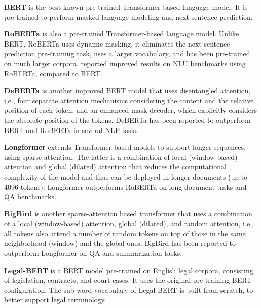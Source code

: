 \documentclass[11pt]{article}
\begin{document}
\noindent\textbf{BERT} \cite{devlin-etal-2019-bert} is the best-known pre-trained Transformer-based language model. It is pre-trained to perform masked language modeling and  next sentence prediction.\vspace{2mm}

\noindent\textbf{RoBERTa} \cite{liu-2019-roberta} is also a pre-trained Transformer-based language model. Unlike BERT, RoBERTa uses dynamic masking, it eliminates the next sentence prediction pre-training task, uses a larger vocabulary, and has been pre-trained on much larger corpora. \citet{liu-2019-roberta} reported improved results on NLU benchmarks using RoBERTa, compared to BERT.\vspace{2mm}

\noindent\textbf{DeBERTa} \cite{he2021deberta} is another improved BERT model that uses disentangled attention, i.e., four separate attention mechanisms considering the content and the relative position of each token, and an enhanced mask decoder, which explicitly considers the absolute position of the tokens. DeBERTa has been reported to outperform BERT and RoBERTa in several NLP tasks \cite{he2021deberta}.\vspace{2mm}

\noindent\textbf{Longformer} \cite{Longformer} extends Transformer-based models to support longer sequences, using sparse-attention. The latter is a combination of local (window-based) attention and global (dilated) attention that reduces the computational complexity of the model and thus can be deployed in longer documents (up to 4096 tokens). Longformer outperforms RoBERTa on long document tasks and QA benchmarks.\vspace{2mm}

\noindent\textbf{BigBird} \cite{BigBird} is another sparse-attention based transformer that uses a combination of a local (window-based) attention, global (dilated), and random attention, i.e., all tokens also attend a number of random tokens on top of those in the same neighborhood (window) and the global ones. BigBird has been reported to outperform Longformer on QA and summarization tasks.\vspace{2mm}

\noindent\textbf{Legal-BERT} \cite{chalkidis-etal-2020-legalbert} is a BERT model pre-trained on English legal corpora, consisting of legislation, contracts, and court cases. It uses the original pre-training BERT configuration. The sub-word vocabulary of Legal-BERT is built from scratch, to better support legal terminology.\vspace{2mm}
\end{document}
